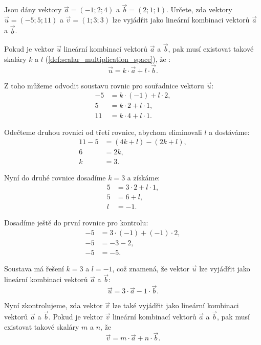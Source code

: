 \begin{example}
    Jsou dány vektory $\vec{a} = (-1;2;4)$ a $\vec{b} = (2;1;1)$. 
    Určete, zda vektory $\vec{u} = (-5; 5; 11)$ a $\vec{v} = (1;3;3)$ lze vyjádřit jako lineární kombinaci vektorů $\vec{a}$ a $\vec{b}$.

    Pokud je vektor $\vec{u}$ lineární kombinací vektorů $\vec{a}$ a $\vec{b}$, pak musí existovat takové skaláry $k$ a $l$ (\ref{def:scalar_multiplication_space}), že :
    \[
    \vec{u} = k \cdot \vec{a} + l \cdot \vec{b}.
    \]

    Z toho můžeme odvodit soustavu rovnic pro souřadnice vektoru $\vec{u}$:
    \begin{align*}
        -5 &= k \cdot (-1) + l \cdot 2,\\
        5 &= k \cdot 2 + l \cdot 1,\\
        11 &= k \cdot 4 + l \cdot 1.
    \end{align*}

    Odečteme druhou rovnici od třetí rovnice, abychom eliminovali $l$ a dostáváme:
    \begin{align*}
        11 - 5 &= (4k + l) - (2k + l),\\
        6 &= 2k,\\
        k &= 3.
    \end{align*}

    Nyní do druhé rovnice dosadíme $k = 3$ a získáme:
    \begin{align*}
        5 &= 3 \cdot 2 + l \cdot 1,\\
        5 &= 6 + l,\\
        l &= -1.
    \end{align*}

    Dosadíme ještě do první rovnice pro kontrolu:
    \begin{align*}
        -5 &= 3 \cdot (-1) + (-1) \cdot 2,\\
        -5 &= -3 - 2,\\
        -5 &= -5.
    \end{align*}

    Soustava má řešení $k = 3$ a $l = -1$, což znamená, že vektor $\vec{u}$ lze vyjádřit jako lineární kombinaci vektorů $\vec{a}$ a $\vec{b}$:
    \[
    \vec{u} = 3 \cdot \vec{a} - 1 \cdot \vec{b}.
    \]

    Nyní zkontrolujeme, zda vektor $\vec{v}$ lze také vyjádřit jako lineární kombinaci vektorů $\vec{a}$ a $\vec{b}$.
    Pokud je vektor $\vec{v}$ lineární kombinací vektorů $\vec{a}$ a $\vec{b}$, pak musí existovat takové skaláry $m$ a $n$, že
    \[
    \vec{v} = m \cdot \vec{a} + n \cdot \vec{b}.
    \]


\end{example}

